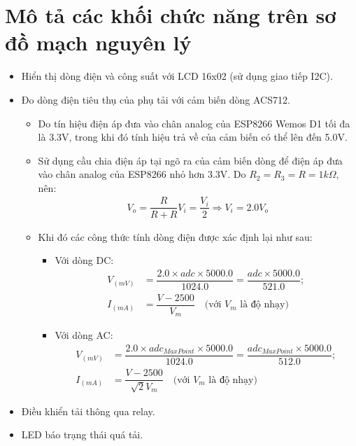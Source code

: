 \section{Mô tả các khối chức năng trên sơ đồ mạch nguyên lý}
    \begin{itemize}
        \item Hiển thị dòng điện và công suất với LCD 16x02 (sử dụng giao tiếp I2C).
        \item Đo dòng điện tiêu thụ của phụ tải với cảm biến dòng ACS712.
            \begin{itemize}
                \item Do tín hiệu điện áp đưa vào chân analog của ESP8266 Wemos D1 tối đa là 3.3V, trong khi đó tính hiệu trả về của cảm biến có thể lên đến 5.0V.
                \item Sử dụng cầu chia điện áp tại ngõ ra của cảm biến dòng để điện áp đưa vào chân analog của ESP8266 nhỏ hơn 3.3V. Do $R_2 = R_3 = R = 1 k \Omega$, nên:
                    \begin{align*}
                        V_o = \dfrac{R}{R + R} V_i = \dfrac{V_i}{2} \Longrightarrow V_i = 2.0 V_o
                    \end{align*}
                \item Khi đó các công thức tính dòng điện được xác định lại như sau:
                    \begin{itemize}
                        \item Với dòng DC:
                            \begin{align*}
                                V_{(mV)} & = \dfrac{2.0 \times adc \times 5000.0}{1024.0} = \dfrac{adc \times 5000.0}{521.0};\\ I_{(mA)} & = \dfrac{V - 2500}{V_m} \quad \textrm{(với } V_m \textrm{ là độ nhạy)}
                            \end{align*}
                        \item Với dòng AC:
                            \begin{align*}
                                V_{(mV)} & = \dfrac{2.0 \times adc_{MaxPoint} \times 5000.0}{1024.0} = \dfrac{adc_{MaxPoint} \times 5000.0}{512.0};\\ I_{(mA)} & = \dfrac{V - 2500}{\sqrt{2}V_m} \quad \textrm{(với } V_m \textrm{ là độ nhạy)}
                            \end{align*}
                    \end{itemize}
            \end{itemize}
        \item Điều khiển tải thông qua relay.
        \item LED báo trạng thái quá tải.
    \end{itemize}

